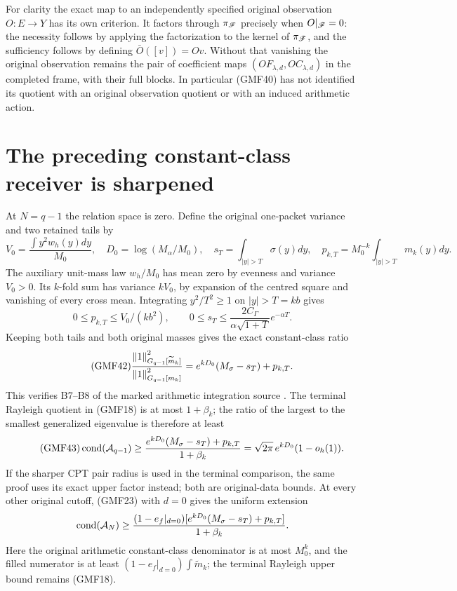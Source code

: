 For clarity the exact map to an independently specified
original observation \(O:E\to Y\) has its own criterion.
It factors through \(\pi_\mathscr F\) precisely when
\(O|_\mathscr F=0\): the necessity follows by applying the
factorization to the kernel of \(\pi_\mathscr F\), and the
sufficiency follows by defining \(\bar O([v])=Ov\).
Without that vanishing the original observation remains
the pair of coefficient maps
\((OF_{\lambda,d},OC_{\lambda,d})\) in the completed frame,
with their full blocks.  In particular (GMF40) has not
identified its quotient with an original observation
quotient or with an induced arithmetic action.

\section{The preceding constant-class receiver is sharpened}

At \(N=q-1\) the relation space is zero.  Define the original
one-packet variance and two retained tails by
\[
 V_0=\frac{\int y^2w_h(y)dy}{M_0},\quad
 D_0=\log(M_\alpha/M_0),\quad
 s_T=\int_{|y|>T}\sigma(y)dy,\quad
 p_{k,T}=M_0^{-k}\int_{|y|>T}m_k(y)dy.
\]
The auxiliary unit-mass law \(w_h/M_0\) has mean zero by
evenness and variance \(V_0>0\).
Its \(k\)-fold sum has variance \(kV_0\), by expansion of
the centred square and vanishing of every cross mean.
Integrating \(y^2/T^2\ge1\) on \(|y|>T=kb\) gives
\[
 0\le p_{k,T}\le V_0/(kb^2),\qquad
 0\le s_T\le
 \frac{2C_\Gamma}{\alpha\sqrt{1+T}}e^{-\alpha T}.
\]
Keeping both tails and both original masses gives the
exact constant-class ratio
\begin{equation}\tag{GMF42}
 \frac{\left\lVert1\right\rVert_{G_{q-1}[\widetilde m_k]}^2}
      {\left\lVert1\right\rVert_{G_{q-1}[m_k]}^2}
 =e^{kD_0}(M_\sigma-s_T)+p_{k,T}.
\end{equation}
This verifies B7--B8 of the marked arithmetic integration
source \cite{a02gmf:markedProvider}.
The terminal Rayleigh quotient in (GMF18) is at most
\(1+\beta_k\); the ratio of the largest to the smallest
generalized eigenvalue is therefore at least
\begin{equation}\tag{GMF43}
 \operatorname{cond}(\mathcal A_{q-1})
 \ge\frac{e^{kD_0}(M_\sigma-s_T)+p_{k,T}}{1+\beta_k}
 =\sqrt{2\pi}\,e^{kD_0}(1-o_h(1)).
\end{equation}
If the sharper CPT pair radius is used in the terminal
comparison, the same proof uses its exact upper factor
instead; both are original-data bounds.
At every other original cutoff, (GMF23) with \(d=0\)
gives the uniform extension
\[
 \operatorname{cond}(\mathcal A_N)\ge
 \frac{(1-e_f|_{d=0})
       [e^{kD_0}(M_\sigma-s_T)+p_{k,T}]}
      {1+\beta_k}.
\]
Here the original arithmetic constant-class denominator
is at most \(M_0^k\), and the filled numerator is at least
\((1-e_f|_{d=0})\int\widetilde m_k\); the terminal
Rayleigh upper bound remains (GMF18).

